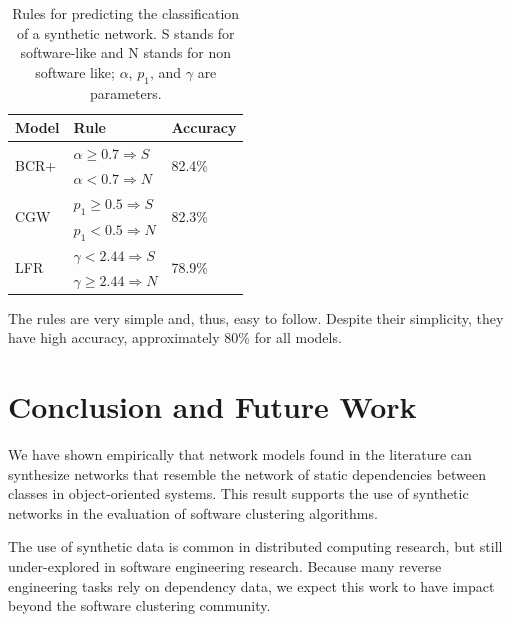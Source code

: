 \begin{table}
\caption{Rules for predicting the classification of a synthetic network. S
stands for software-like and N stands for non software like; $\alpha$, $p_1$, and $\gamma$ are parameters.}
\centering
\begin{tabular}{|l|l|l|}
\hline
Model & Rule & Accuracy \\
\hline 
\hline
\multirow{2}{*}{BCR+}
     & $\alpha \ge 0.7 \Rightarrow S$ & \multirow{2}{*}{82.4\%}  \\ 
     & $\alpha < 0.7 \Rightarrow N$ & \\ 
\hline
\multirow{2}{*}{CGW}
     & $p_1 \ge 0.5 \Rightarrow S$ & \multirow{2}{*}{82.3\%} \\  
     & $p_1 < 0.5 \Rightarrow N$ & \\  
\hline
\multirow{2}{*}{LFR}   
     & $\gamma < 2.44 \Rightarrow S$ & \multirow{2}{*}{78.9\%} \\ 
     & $\gamma \ge 2.44 \Rightarrow N$ & \\ 
\hline
\end{tabular}
\label{tab:rules}
\end{table}

The rules are very simple and, thus, easy to follow. Despite their simplicity,
they have high accuracy, approximately 80\% for all models.  


\section{Conclusion and Future Work} \label{sec:conclusion}

We have shown empirically that network models found in the literature can
synthesize networks that resemble the network of static dependencies between
classes in object-oriented systems. This result supports the use of synthetic
networks in the evaluation of software clustering algorithms.

The use of synthetic data is common in distributed computing research, but
still under-explored in software engineering research. Because many reverse
engineering tasks rely on dependency data, we expect this
work to have impact beyond the software clustering community.

